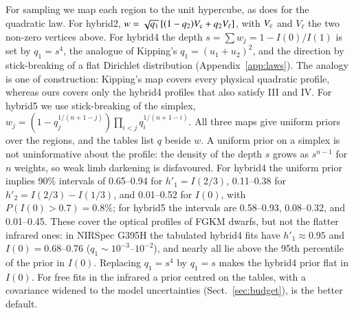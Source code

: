 \documentclass{aa}
\begin{document}
For sampling we map each region to the unit hypercube, as \citet{kipping2013}
does for the quadratic law. For hybrid2,
$w=\sqrt{q_1}\,[(1-q_2)V_{\rm c}+q_2V_\ell]$, with $V_{\rm c}$ and $V_\ell$
the two non-zero vertices above. For hybrid4 the depth $s=\sum w_j=1-I(0)/I(1)$
is set by $q_1=s^4$, the analogue of Kipping's $q_1=(u_1+u_2)^2$, and the
direction by stick-breaking of a flat Dirichlet distribution
(Appendix~\ref{app:laws}). The analogy is one of construction: Kipping's map
covers every physical quadratic profile, whereas ours covers only the hybrid4
profiles that also satisfy III and IV. For hybrid5 we use stick-breaking of
the simplex, $w_j=(1-q_j^{1/(n+1-j)})\prod_{i<j}q_i^{1/(n+1-i)}$. All three
maps give uniform priors over the regions, and the tables list $q$ beside $w$.
A uniform prior on a simplex is not uninformative about the profile: the
density of the depth $s$ grows as $s^{n-1}$ for $n$ weights, so weak limb
darkening is disfavoured. For hybrid4 the uniform prior implies 90\% intervals
of 0.65--0.94 for $h'_1=I(2/3)$, 0.11--0.38 for $h'_2=I(2/3)-I(1/3)$, and
0.01--0.52 for $I(0)$, with $P(I(0)>0.7)=0.8\%$; for hybrid5 the intervals
are 0.58--0.93, 0.08--0.32, and 0.01--0.45. These cover the optical profiles
of FGKM dwarfs, but not the flatter infrared ones: in NIRSpec G395H the
tabulated hybrid4 fits have $h'_1\approx0.95$ and $I(0)=0.68$--0.76
($q_1\sim10^{-3}$--$10^{-2}$), and nearly all lie above the 95th percentile
of the prior in $I(0)$. Replacing
$q_1=s^4$ by $q_1=s$ makes the hybrid4 prior flat in $I(0)$. For free fits
in the infrared a prior centred on the tables, with a covariance widened to
the model uncertainties (Sect.~\ref{sec:budget}), is the better default.

\end{document}
